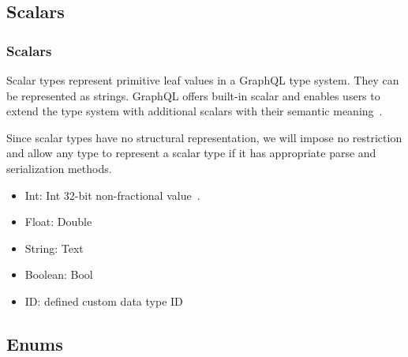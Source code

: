 \subsection{Scalars}
\begin{frame}\frametitle{Scalars}

Scalar types represent primitive leaf values in a GraphQL type system. They can be represented as strings. GraphQL offers built-in scalar and enables users to extend the type system with additional scalars with their semantic meaning~\cite{gql-spec}.

Since scalar types have no structural representation, we will impose no restriction and allow any type to represent a scalar type if it has appropriate parse and serialization methods.

\begin{itemize}

  \item Int: Int
    32-bit non-fractional value~\cite{gql-spec}. 

  \item Float: Double

  \item String: Text
  \item Boolean: Bool
  \item ID:  defined custom data type ID 
\end{itemize}

\end{frame}

\subsection{Enums}

